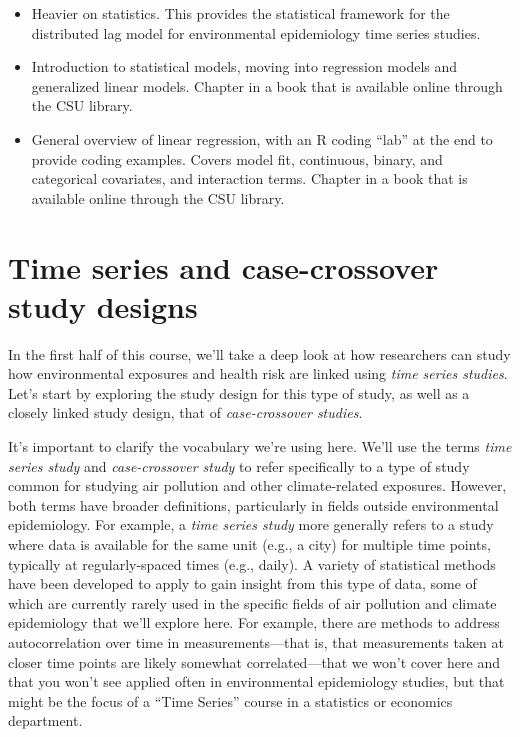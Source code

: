 \documentclass[
]{book}
\begin{document}
\begin{itemize}
\item
  \citet{gasparrini2014modeling} Heavier on statistics. This provides the statistical
  framework for the distributed lag model for environmental epidemiology time
  series studies.
\item
  \citet{dunn2018generalized1} Introduction to statistical models, moving into regression models and
  generalized linear models. Chapter in a book that is available online through the CSU library.
\item
  \citet{james2013introduction3} General overview of linear regression, with an R coding
  ``lab'' at the end to provide coding examples. Covers model fit, continuous, binary,
  and categorical covariates, and interaction terms. Chapter in a book that is
  available online through the CSU library.
\end{itemize}

\section{Time series and case-crossover study designs}\label{time-series-and-case-crossover-study-designs}

In the first half of this course, we'll take a deep look at how researchers
can study how environmental exposures and health risk are linked using
\emph{time series studies}. Let's start by exploring the study design for this type
of study, as well as a closely linked study design, that of \emph{case-crossover
studies}.

It's important to clarify the vocabulary we're using here. We'll use the terms
\emph{time series study} and \emph{case-crossover study} to refer specifically to a type
of study common for studying air pollution and other climate-related exposures.
However, both terms have broader definitions, particularly in fields outside
environmental epidemiology. For example, a \emph{time series study} more generally
refers to a study where data is available for the same unit (e.g., a city)
for multiple time points, typically at regularly-spaced times (e.g., daily).
A variety of statistical methods have been developed to apply to gain insight
from this type of data, some of which are currently rarely used in the specific
fields of air pollution and climate epidemiology that we'll explore here. For
example, there are methods to address autocorrelation over time in
measurements---that is, that measurements taken at closer time points are likely
somewhat correlated---that we won't cover here and that you won't see applied
often in environmental epidemiology studies, but that might be the focus of
a ``Time Series'' course in a statistics or economics department.
\end{document}
